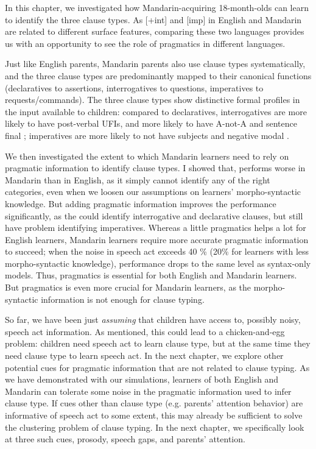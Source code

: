 In this chapter, we investigated how Mandarin-acquiring 18-month-olds can learn to identify the three clause types. As [+int] and [imp] in English and Mandarin are related to different surface features, comparing these two languages provides us with an opportunity to see the role of pragmatics in different languages.

Just like English parents, Mandarin parents also 
use clause types systematically, and the three clause types are predominantly mapped to their canonical functions (declaratives to assertions, interrogatives to questions, imperatives to requests/commands). The three clause types show distinctive formal profiles in the input available to children: compared to declaratives, interrogatives are more likely to have post-verbal UFIs, and more likely to have A-not-A and sentence final ; imperatives are more likely to not have subjects and negative modal .

We then investigated the extent to which Mandarin learners need to rely on pragmatic information to identify clause types. I showed that, \dlearnerabbr{} performs worse in Mandarin than in English, as it simply cannot identify any of the right categories, even when we loosen our assumptions on learners' morpho-syntactic knowledge. But adding pragmatic information improves the performance significantly, as the \plearnerabbr{} could identify interrogative and declarative clauses, but still have problem identifying imperatives. Whereas a little pragmatics helps a lot for English learners, Mandarin learners require more accurate pragmatic information to succeed; when the noise in speech act exceeds 40 \% (20\% for learners with less morpho-syntactic knowledge), performance drops to the same level as syntax-only models.
Thus, pragmatics is essential for both English and Mandarin learners. But pragmatics is even more crucial for Mandarin learners, as the morpho-syntactic information is not enough for clause typing. 

So far, we have been just \emph{assuming} that children have access to, possibly noisy, speech act information. As mentioned, this could lead to a chicken-and-egg problem: children need speech act to learn clause type, but at the same time they need clause type to learn speech act. In the next chapter, we explore other potential cues for pragmatic information that are not related to clause typing. As we have demonstrated with our simulations, learners of both English and Mandarin can tolerate some noise in the pragmatic information used to infer clause type. If cues other than clause type (e.g. parents' attention behavior) are informative of speech act to some extent, this may already be sufficient to solve the clustering problem of clause typing. In the next chapter, we specifically look at three such cues, prosody, speech gaps, and parents' attention.

